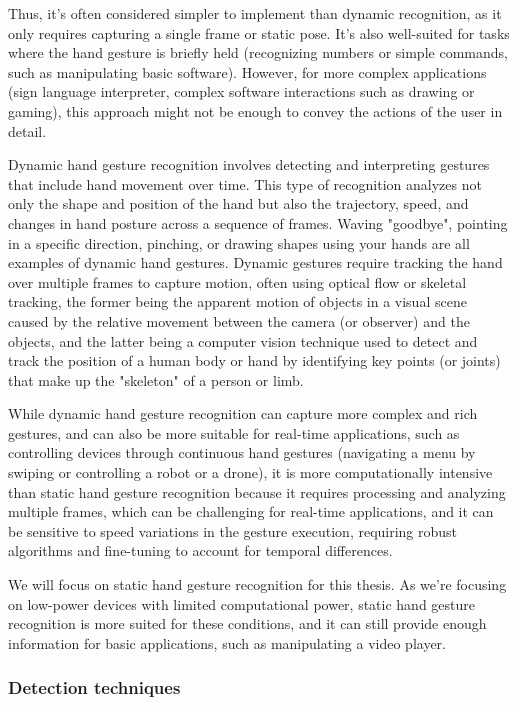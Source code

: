 \documentclass[12pt]{article}
\begin{document}
Thus, it's often considered simpler to implement than dynamic recognition, as it only requires capturing a single frame or static pose. It's also well-suited for tasks where the hand gesture is briefly held (recognizing numbers or simple commands, such as manipulating basic software). However, for more complex applications (sign language interpreter, complex software interactions such as drawing or gaming), this approach might not be enough to convey the actions of the user in detail.

Dynamic hand gesture recognition involves detecting and interpreting gestures that include hand movement over time. This type of recognition analyzes not only the shape and position of the hand but also the trajectory, speed, and changes in hand posture across a sequence of frames. Waving "goodbye", pointing in a specific direction, pinching, or drawing shapes using your hands are all examples of dynamic hand gestures. Dynamic gestures require tracking the hand over multiple frames to capture motion, often using optical flow or skeletal tracking, the former being the apparent motion of objects in a visual scene caused by the relative movement between the camera (or observer) and the objects, and the latter being a computer vision technique used to detect and track the position of a human body or hand by identifying key points (or joints) that make up the "skeleton" of a person or limb.

While dynamic hand gesture recognition can capture more complex and rich gestures, and can also be more suitable for real-time applications, such as controlling devices through continuous hand gestures (navigating a menu by swiping or controlling a robot or a drone), it is more computationally intensive than static hand gesture recognition because it requires processing and analyzing multiple frames, which can be challenging for real-time applications, and it can be sensitive to speed variations in the gesture execution, requiring robust algorithms and fine-tuning to account for temporal differences.

We will focus on static hand gesture recognition for this thesis. As we're focusing on low-power devices with limited computational power, static hand gesture recognition is more suited for these conditions, and it can still provide enough information for basic applications, such as manipulating a video player.

\subsubsection{Detection techniques}
\end{document}
